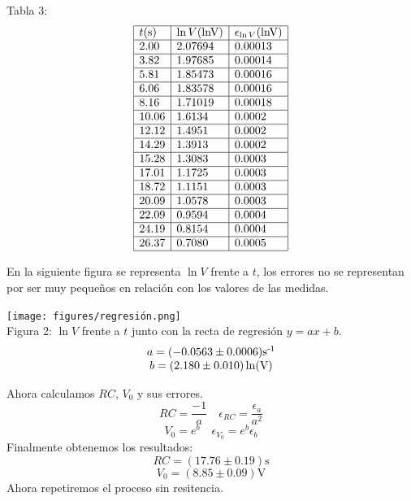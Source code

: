 \documentclass{article}
\begin{document}
\begin{multicols}{2}
$$$$
\begin{center}
  Tabla 3:
  $$
  \begin{array}{|l|l|l|} \hline
    t\text{(s)} & \ln V\text{(lnV)} & \epsilon_{\ln V}\text{(lnV)} \\ \hline
    2.00  & 2.07694 & 0.00013  \\ \hline
    3.82  & 1.97685 & 0.00014  \\ \hline
    5.81  & 1.85473 & 0.00016  \\ \hline
    6.06  & 1.83578 & 0.00016  \\ \hline
    8.16  & 1.71019 & 0.00018  \\ \hline
    10.06 & 1.6134  & 0.0002  \\ \hline
    12.12 & 1.4951  & 0.0002  \\ \hline
    14.29 & 1.3913  & 0.0002  \\ \hline
    15.28 & 1.3083  & 0.0003  \\ \hline
    17.01 & 1.1725  & 0.0003  \\ \hline
    18.72 & 1.1151  & 0.0003  \\ \hline
    20.09 & 1.0578  & 0.0003  \\ \hline
    22.09 & 0.9594  & 0.0004  \\ \hline
    24.19 & 0.8154  & 0.0004  \\ \hline
    26.37 & 0.7080  & 0.0005  \\ \hline
    \end{array}
  $$
\end{center}
En la siguiente figura se representa $\ln V$ frente a $t$, los errores no se representan por ser muy pequeños en relación con los valores de las medidas.
\begin{center}
  \texttt{[image: figures/regresión.png]}\\
  Figura 2: $\ln V$ frente a $t$ junto con la recta de regresión $y=ax+b$.
  $$
  \begin{array}{cc}
    a = (-0.0563\pm 0.0006) \text{s\textsuperscript{-1}} \\
    b = (2.180\pm 0.010) \ln(\text{V}) \\
  \end{array}
  $$
\end{center}
Ahora calculamos $RC$, $V_0$ y sus errores.
$$
RC = \frac{-1}{a} \quad \epsilon_{RC} = \frac{\epsilon_a}{a^2}
$$
$$
V_0 = e^b \quad \epsilon_{V_0} = e^b \epsilon_b
$$
Finalmente obtenemos los resultados:
$$
RC = ( 17.76\pm 0.19 ) \text{s}
$$
$$
V_0 = ( 8.85\pm 0.09 ) \text{V}
$$
Ahora repetiremos el proceso sin resitencia.

\end{multicols}
\end{document}
